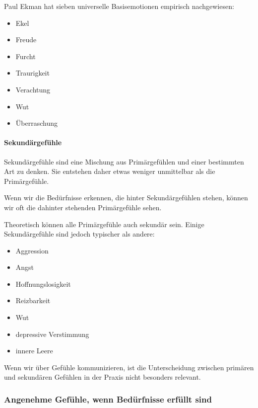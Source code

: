 Paul Ekman\cite{ekman-emotions} hat sieben universelle Basisemotionen empirisch nachgewiesen:

\begin{itemize}
  \item Ekel
  \item Freude
  \item Furcht
  \item Traurigkeit
  \item Verachtung
  \item Wut
  \item Überraschung
\end{itemize}

\paragraph{Sekundärgefühle}

Sekundärgefühle sind eine Mischung aus Primärgefühlen und einer bestimmten Art zu denken. Sie entstehen daher etwas weniger unmittelbar als die Primärgefühle.

Wenn wir die Bedürfnisse erkennen, die hinter Sekundärgefühlen stehen, können wir oft die dahinter stehenden Primärgefühle sehen.

Theoretisch können alle Primärgefühle auch sekundär sein. Einige Sekundärgefühle sind jedoch typischer als andere:

\begin{itemize}
 \item Aggression
 \item Angst
 \item Hoffnungslosigkeit
 \item Reizbarkeit
 \item Wut
 \item depressive Verstimmung
 \item innere Leere
\end{itemize}

Wenn wir über Gefühle kommunizieren, ist die Unterscheidung zwischen primären und sekundären Gefühlen in der Praxis nicht besonders relevant.

\subsubsection{Angenehme Gefühle, wenn Bedürfnisse erfüllt sind}
\label{gefuehle-liste}
\label{angenehme-gefuehle}


